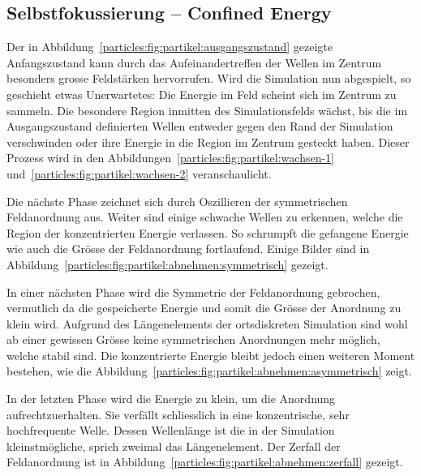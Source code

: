 \subsection{Selbstfokussierung -- Confined Energy}


Der in Abbildung~\ref{particles:fig:partikel:ausgangszustand} gezeigte Anfangszustand kann durch das Aufeinandertreffen der Wellen im Zentrum besonders grosse Feldstärken hervorrufen.
Wird die Simulation nun abgespielt, so geschieht etwas Unerwartetes: Die Energie im Feld scheint sich im Zentrum zu sammeln.
Die besondere Region inmitten des Simulationsfelds wächst, 
bis die im Ausgangszustand definierten Wellen entweder gegen den Rand der Simulation verschwinden oder ihre Energie in die Region im Zentrum gesteckt haben.
Dieser Prozess wird in den Abbildungen~\ref{particles:fig:partikel:wachsen-1} und~\ref{particles:fig:partikel:wachsen-2} veranschaulicht.


Die nächste Phase zeichnet sich durch Oszillieren der symmetrischen Feldanordnung aus. 
Weiter sind einige schwache Wellen zu erkennen, welche die Region der konzentrierten Energie verlassen.
So schrumpft die gefangene Energie wie auch die Grösse der Feldanordnung fortlaufend.
Einige Bilder sind in Abbildung~\ref{particles:fig:partikel:abnehmen:symmetrisch} gezeigt.


In einer nächsten Phase wird die Symmetrie der Feldanordnung gebrochen, 
vermutlich da die gespeicherte Energie und somit die Grösse der Anordnung zu klein wird.
Aufgrund des Längenelements der ortsdiskreten Simulation sind wohl ab einer gewissen Grösse keine symmetrischen Anordnungen mehr möglich, welche stabil sind.
Die konzentrierte Energie bleibt jedoch einen weiteren Moment bestehen, 
wie die Abbildung~\ref{particles:fig:partikel:abnehmen:asymmetrisch} zeigt.


In der letzten Phase wird die Energie zu klein, um die Anordnung aufrechtzuerhalten. 
Sie verfällt schliesslich in eine konzentrische, sehr hochfrequente Welle. 
Dessen Wellenlänge ist die in der Simulation kleinstmögliche, sprich zweimal das Längenelement.
Der Zerfall der Feldanordnung ist in Abbildung~\ref{particles:fig:partikel:abnehmen:zerfall} gezeigt.



